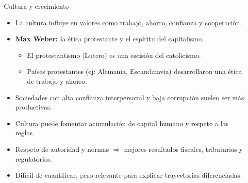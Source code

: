 \documentclass{beamer}
\begin{document}
\begin{frame}{Cultura y crecimiento}
    \begin{itemize}
        \item La cultura influye en valores como trabajo, ahorro, confianza y cooperación.
        \item \textbf{Max Weber:} la ética protestante y el espíritu del capitalismo.
        \begin{itemize}
            \item El protestantismo (Lutero) es una escisión del catolicismo.
            \item Países protestantes (ej: Alemania, Escandinavia) desarrollaron una ética de trabajo y ahorro.
        \end{itemize}
        \item Sociedades con alta confianza interpersonal y baja corrupción suelen ser más productivas.
        \item Cultura puede fomentar acumulación de capital humano y respeto a las reglas.
        \item Respeto de autoridad y normas $\Rightarrow$ mejores resultados fiscales, tributarios y regulatorios.
        \item Difícil de cuantificar, pero relevante para explicar trayectorias diferenciadas.
    \end{itemize}
\end{frame}
\end{document}

